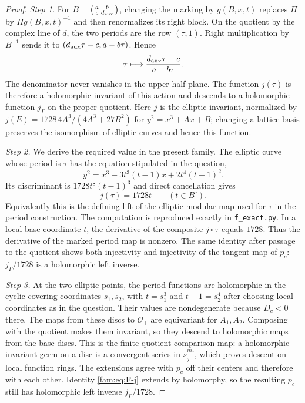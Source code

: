 \documentclass[11pt,a4paper]{article}
\theoremstyle{plain}
\theoremstyle{definition}
\begin{document}
\begin{proof}
\par\noindent\textit{Step 1.} For $B=\bigl(\begin{smallmatrix}a&b\\c&d_{\rm aux}\end{smallmatrix}\bigr)$, changing
the marking by $g(B,x,t)$ replaces $\Pi$ by $\Pi g(B,x,t)^{-1}$ and then
renormalizes its right block.  On the quotient by the complex line of
$d$, the two periods are the row $(\tau,1)$.  Right multiplication by
$B^{-1}$ sends it to $(d_{\rm aux}\tau-c,a-b\tau)$.  Hence
\begin{equation}\label{fam:eq:F-tauaction}
 \tau\longmapsto\frac{d_{\rm aux}\tau-c}{a-b\tau}.
\end{equation}
The denominator never vanishes in the upper half plane.  The function
$j(\tau)$ is therefore a holomorphic invariant of this action and
descends to a holomorphic function $j_\Gamma$ on the proper quotient.
Here $j$ is the elliptic invariant, normalized by
$j(E)=1728\,4A^3/(4A^3+27B^2)$ for $y^2=x^3+Ax+B$; changing a lattice
basis preserves the isomorphism of elliptic curves and hence this
function.

\par\noindent\textit{Step 2.} We derive the required value in the present family.  The elliptic curve
whose period is $\tau$ has the equation stipulated in the question,
\[
 y^2=x^3-3t^3(t-1)x+2t^4(t-1)^2.
\]
Its discriminant is $1728t^8(t-1)^3$ and direct cancellation gives
\begin{equation}\label{fam:eq:F-j}
 j(\tau)=1728t\qquad(t\in B^\circ).
\end{equation}
Equivalently this is the defining lift of the elliptic modular map used
for $\tau$ in the period construction.  The computation is reproduced
exactly in \texttt{f\_exact.py}.  In a local base coordinate $t$, the
derivative of the composite $j\circ\tau$ equals $1728$.  Thus the
derivative of the marked period map is nonzero.  The same identity after
passage to the quotient shows both injectivity and injectivity of the
tangent map of $p_c$: $j_\Gamma/1728$ is a holomorphic left inverse.

\par\noindent\textit{Step 3.} At the two elliptic points, the period functions are holomorphic in the
cyclic covering coordinates $s_1,s_2$, with $t=s_1^3$ and
$t-1=s_2^4$ after choosing local coordinates as in the question.  Their
values are nondegenerate because $D_c<0$ there.  The maps from these
discs to $\mathcal O_+$ are equivariant for $A_1,A_2$.  Composing with
the quotient makes them invariant, so they descend to holomorphic maps
from the base discs.  This is the finite-quotient comparison map: a
holomorphic invariant germ on a disc is a convergent series in $s_j^{m_j}$,
which proves descent on local function rings.  The extensions agree
with $p_c$ off their centers and therefore with each other.  Identity
\eqref{fam:eq:F-j} extends by holomorphy, so the resulting $\bar p_c$ still
has holomorphic left inverse $j_\Gamma/1728$.


\end{proof}
\end{document}
